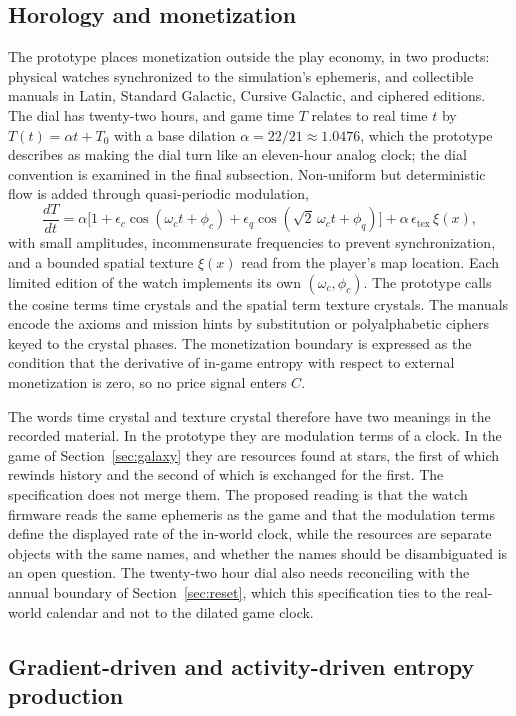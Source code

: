 \documentclass[11pt]{article}
\begin{document}
\subsection{Horology and monetization}

The prototype places monetization outside the play economy, in two products: physical watches synchronized to the simulation's ephemeris, and collectible manuals in Latin, Standard Galactic, Cursive Galactic, and ciphered editions. The dial has twenty-two hours, and game time $T$ relates to real time $t$ by $T(t)=\alpha t+T_0$ with a base dilation $\alpha=22/21\approx1.0476$, which the prototype describes as making the dial turn like an eleven-hour analog clock; the dial convention is examined in the final subsection. Non-uniform but deterministic flow is added through quasi-periodic modulation,
\[
\frac{dT}{dt}=\alpha\Big[1+\epsilon_c\cos(\omega_ct+\phi_c)+\epsilon_q\cos(\sqrt2\,\omega_ct+\phi_q)\Big]+\alpha\,\epsilon_{\text{tex}}\,\xi(x),
\]
with small amplitudes, incommensurate frequencies to prevent synchronization, and a bounded spatial texture $\xi(x)$ read from the player's map location. Each limited edition of the watch implements its own $(\omega_c,\phi_c)$. The prototype calls the cosine terms time crystals and the spatial term texture crystals. The manuals encode the axioms and mission hints by substitution or polyalphabetic ciphers keyed to the crystal phases. The monetization boundary is expressed as the condition that the derivative of in-game entropy with respect to external monetization is zero, so no price signal enters $C$.

The words time crystal and texture crystal therefore have two meanings in the recorded material. In the prototype they are modulation terms of a clock. In the game of Section~\ref{sec:galaxy} they are resources found at stars, the first of which rewinds history and the second of which is exchanged for the first. The specification does not merge them. The proposed reading is that the watch firmware reads the same ephemeris as the game and that the modulation terms define the displayed rate of the in-world clock, while the resources are separate objects with the same names, and whether the names should be disambiguated is an open question. The twenty-two hour dial also needs reconciling with the annual boundary of Section~\ref{sec:reset}, which this specification ties to the real-world calendar and not to the dilated game clock.

\subsection{Gradient-driven and activity-driven entropy production}
\end{document}
